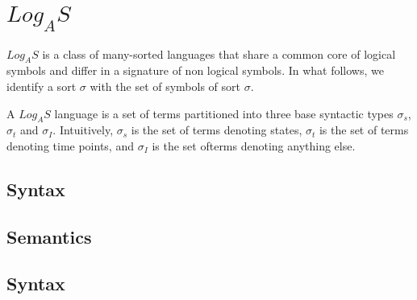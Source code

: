 \chapter{$Log_AS$}

$Log_AS$ is a class of many-sorted languages that share a common core of logical symbols and differ in a signature of non logical symbols. In what follows, we identify a sort $\sigma$ with
the set of symbols of sort $\sigma$.

A $Log_AS$ language is a set of terms partitioned into three base syntactic types $\sigma_s$, $\sigma_t$
and $\sigma_I$. Intuitively, $\sigma_s$ is the set of terms denoting states, $\sigma_t$ is the set of terms denoting time points, and $\sigma_I$ is the set ofterms denoting anything else.

\section{Syntax}
\section{Semantics}


\section{Syntax}
